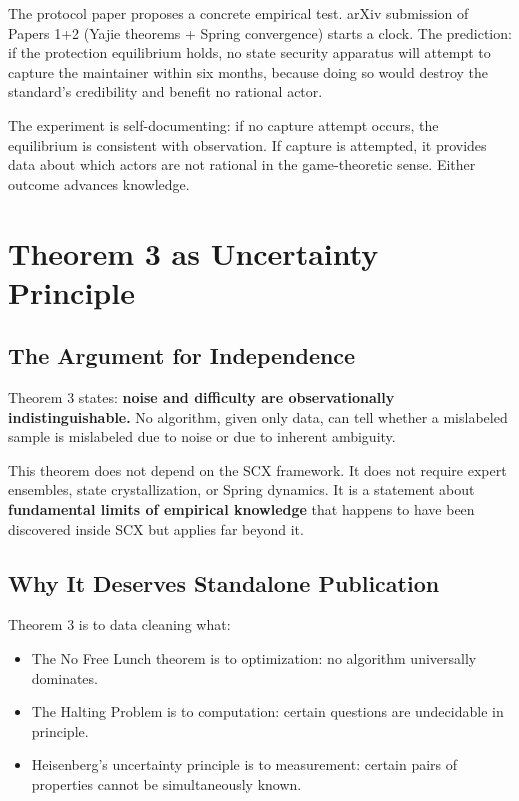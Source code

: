 \documentclass[12pt,a4paper]{ctexart}
\begin{document}
The protocol paper proposes a concrete empirical test. arXiv submission of Papers 1+2 (Yajie theorems + Spring convergence) starts a clock. The prediction: if the protection equilibrium holds, no state security apparatus will attempt to capture the maintainer within six months, because doing so would destroy the standard's credibility and benefit no rational actor.

The experiment is self-documenting: if no capture attempt occurs, the equilibrium is consistent with observation. If capture is attempted, it provides data about which actors are not rational in the game-theoretic sense. Either outcome advances knowledge.

\section{Theorem 3 as Uncertainty Principle}

\subsection{The Argument for Independence}

Theorem 3 states: \textbf{noise and difficulty are observationally indistinguishable.} No algorithm, given only data, can tell whether a mislabeled sample is mislabeled due to noise or due to inherent ambiguity.

This theorem does not depend on the SCX framework. It does not require expert ensembles, state crystallization, or Spring dynamics. It is a statement about \textbf{fundamental limits of empirical knowledge} that happens to have been discovered inside SCX but applies far beyond it.

\subsection{Why It Deserves Standalone Publication}

Theorem 3 is to data cleaning what:
\begin{itemize}
\item The No Free Lunch theorem is to optimization: no algorithm universally dominates.
\item The Halting Problem is to computation: certain questions are undecidable in principle.
\item Heisenberg's uncertainty principle is to measurement: certain pairs of properties cannot be simultaneously known.
\end{itemize}
\end{document}
